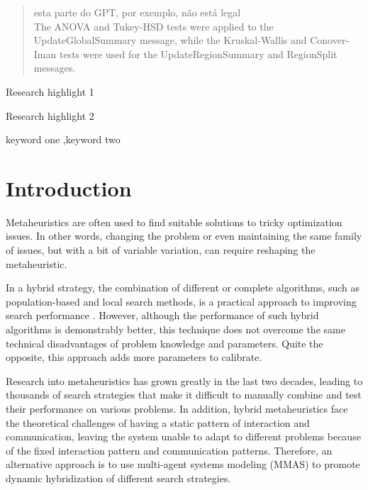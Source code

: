 \documentclass[preprint,12pt]{elsarticle}
\begin{document}
\begin{frontmatter}
\begin{abstract}
esta parte do GPT, por exemplo, não está legal\\


The ANOVA and Tukey-HSD tests were applied to the UpdateGlobalSummary message, while the Kruskal-Wallis and Conover-Iman tests were used for the UpdateRegionSummary and RegionSplit messages.


\end{abstract}


\begin{highlights}
\item Research highlight 1
\item Research highlight 2
\end{highlights}

\begin{keyword}
keyword one \sep keyword two
\end{keyword}

\end{frontmatter}


\section{Introduction}

Metaheuristics are often used to find suitable solutions to tricky optimization issues. In other words, changing the problem or even maintaining the same family of issues, but with a bit of variable variation, can require reshaping the metaheuristic.

In a hybrid strategy, the combination of different or complete algorithms, such as population-based and local search methods, is a practical approach to improving search performance \cite{dokeroglu2019}. However, although the performance of such hybrid algorithms is demonstrably better, this technique does not overcome the same technical disadvantages of problem knowledge and parameters. Quite the opposite, this approach adds more parameters to calibrate.

Research into metaheuristics has grown greatly in the last two decades, leading to thousands of search strategies that make it difficult to manually combine and test their performance on various problems. In addition, hybrid metaheuristics face the theoretical challenges of having a static pattern of interaction and communication, leaving the system unable to adapt to different problems because of the fixed interaction pattern and communication patterns. Therefore, an alternative approach is to use multi-agent systems modeling (MMAS) to promote dynamic hybridization of different search strategies.
\end{document}
